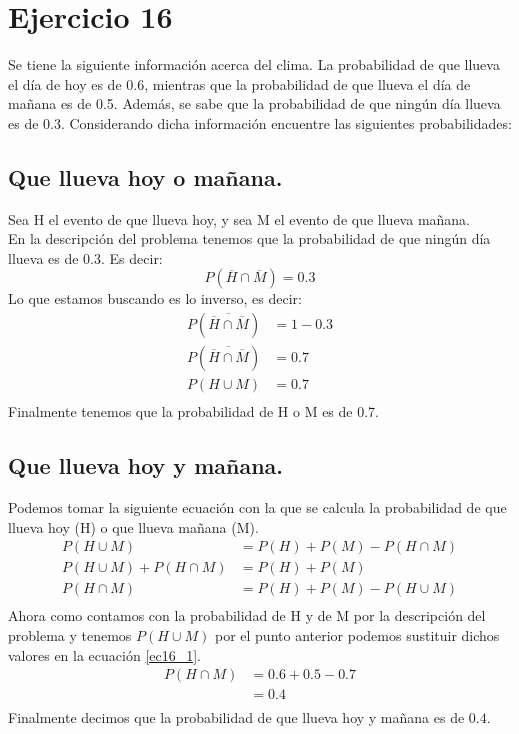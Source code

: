\documentclass[12pt]{article}
\begin{document}
\section{Ejercicio 16}
Se tiene la siguiente información acerca del clima. La probabilidad de que llueva el día de hoy
es de 0.6, mientras que la probabilidad de que llueva el día de mañana es de 0.5. Además, se
sabe que la probabilidad de que ningún día llueva es de 0.3. Considerando dicha información
encuentre las siguientes probabilidades:
\subsection{Que llueva hoy o mañana.}
Sea H el evento de que llueva hoy, y sea M el evento de que llueva mañana.\\
En la descripción del problema tenemos que la probabilidad de que ningún día llueva es de 0.3. Es decir:
\begin{equation}
	P(\overline{H} \cap \overline{M}) = 0.3
\end{equation}
Lo que estamos buscando es lo inverso, es decir:
\begin{equation}
\begin{split}
P(\overline{\overline{H} \cap \overline{M}}) &= 1 - 0.3 \\
P(\overline{\overline{H} \cap \overline{M}}) &= 0.7 \\
P(H \cup M) &= 0.7 \\
\end{split}
\end{equation}
Finalmente tenemos que la probabilidad de H o M es de 0.7.
\subsection{Que llueva hoy y mañana.}
Podemos tomar la siguiente ecuación con la que se calcula la probabilidad de que llueva hoy (H) o que llueva mañana (M).\\
\begin{equation}\label{ec16_1}
	\begin{split}
		P(H\cup M) &= P(H) + P(M) - P(H\cap M)\\
		P(H\cup M) + P(H\cap M) &= P(H) + P(M)\\
		P(H\cap M) &= P(H) + P(M) - P(H\cup M)\\
	\end{split}
\end{equation}
Ahora como contamos con la probabilidad de H y de M por la descripción del problema y tenemos $P(H\cup M)$ por el punto anterior podemos sustituir dichos valores en la ecuación \ref{ec16_1}.
\begin{equation}\label{ec16_2}
\begin{split}
P(H\cap M) &= 0.6 + 0.5 - 0.7\\
&= 0.4\\
\end{split}
\end{equation}
Finalmente decimos que la probabilidad de que llueva hoy y mañana es de $0.4$.
\end{document}
